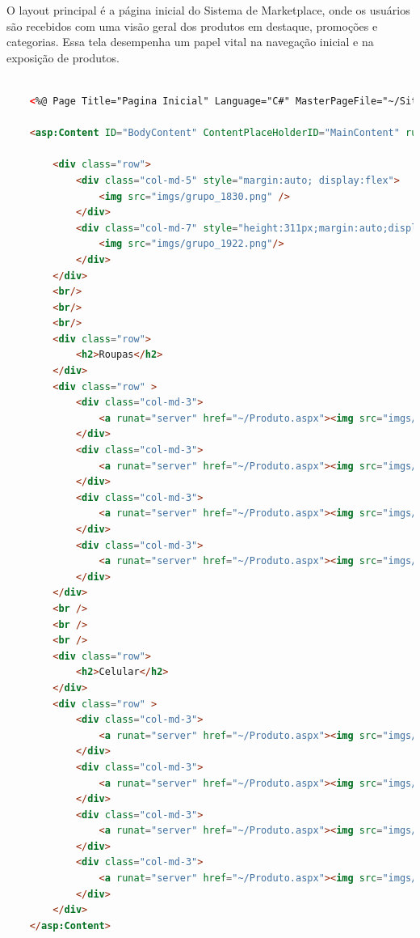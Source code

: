 \documentclass[
	12pt,				%
	openright,			%
	twoside,			%
	a4paper,			%
	english,			%
	brazil				%
	]{abntex2}
\begin{document}
O layout principal é a página inicial do Sistema de Marketplace, onde os usuários são recebidos com uma visão geral dos produtos em destaque, promoções e categorias. Essa tela desempenha um papel vital na navegação inicial e na exposição de produtos.

\begin{lstlisting}[language=HTML, caption=Tela Principal em ASPX, label=lst:aspx]

	<%@ Page Title="Pagina Inicial" Language="C#" MasterPageFile="~/Site.Master" AutoEventWireup="true" CodeBehind="Default.aspx.cs" Inherits="UNIPPIMVIII._Default" %>

	<asp:Content ID="BodyContent" ContentPlaceHolderID="MainContent" runat="server">
	
		<div class="row">
			<div class="col-md-5" style="margin:auto; display:flex">
				<img src="imgs/grupo_1830.png" />
			</div>
			<div class="col-md-7" style="height:311px;margin:auto;display:flex">
				<img src="imgs/grupo_1922.png"/>
			</div>
		</div>
		<br/>
		<br/>
		<br/>
		<div class="row">
			<h2>Roupas</h2>
		</div>
		<div class="row" >
			<div class="col-md-3">
				<a runat="server" href="~/Produto.aspx"><img src="imgs/roupa1.png" style="width:200px;height:200px;border:2px solid black"/></a>
			</div>
			<div class="col-md-3">
				<a runat="server" href="~/Produto.aspx"><img src="imgs/roupa2.png" style="width:200px;height:200px;border:2px solid black"/></a>
			</div>
			<div class="col-md-3">
				<a runat="server" href="~/Produto.aspx"><img src="imgs/roupa1.png" style="width:200px;height:200px;border:2px solid black"/></a>
			</div>
			<div class="col-md-3">
				<a runat="server" href="~/Produto.aspx"><img src="imgs/roupa2.png" style="width:200px;height:200px;border:2px solid black"/></a>
			</div>
		</div>
		<br />
		<br />
		<br />
		<div class="row">
			<h2>Celular</h2>
		</div>
		<div class="row" >
			<div class="col-md-3">
				<a runat="server" href="~/Produto.aspx"><img src="imgs/celular1.png" style="width:200px;height:200px;border:2px solid black"/></a>
			</div>
			<div class="col-md-3">
				<a runat="server" href="~/Produto.aspx"><img src="imgs/celular2.png" style="width:200px;height:200px;border:2px solid black"/></a>
			</div>
			<div class="col-md-3">
				<a runat="server" href="~/Produto.aspx"><img src="imgs/celular3.png" style="width:200px;height:200px;border:2px solid black"/></a>
			</div>
			<div class="col-md-3">
				<a runat="server" href="~/Produto.aspx"><img src="imgs/celular4.png" style="width:200px;height:200px;border:2px solid black"/></a>
			</div>
		</div>
	</asp:Content>
	

\end{lstlisting}
\end{document}
